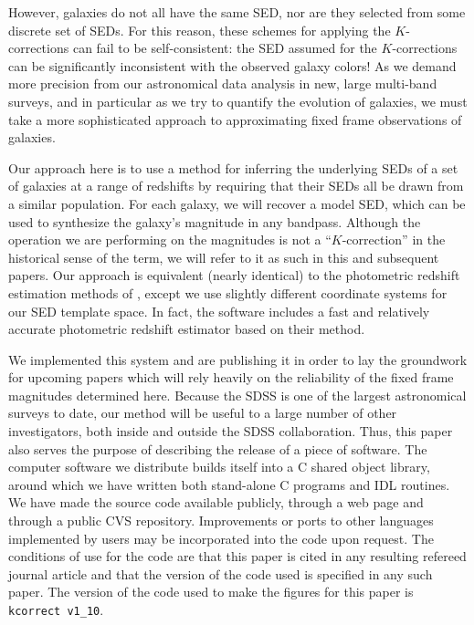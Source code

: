\documentclass[10pt,preprint]{aastex}
\newcommand{\kversion}{{\tt v1\_10}}
\begin{document}
However, galaxies do not all have the same SED, nor are they selected
from some discrete set of SEDs. For this reason, these schemes for
applying the $K$-corrections can fail to be self-consistent: the SED
assumed for the $K$-corrections can be significantly inconsistent with
the observed galaxy colors! As we demand more precision from our
astronomical data analysis in new, large multi-band surveys, and in
particular as we try to quantify the evolution of galaxies, we must
take a more sophisticated approach to approximating fixed frame
observations of galaxies.

Our approach here is to use a method for inferring the underlying SEDs
of a set of galaxies at a range of redshifts by requiring that their
SEDs all be drawn from a similar population. For each galaxy, we will
recover a model SED, which can be used to synthesize the galaxy's
magnitude in any bandpass. Although the operation we are performing on
the magnitudes is not a ``$K$-correction'' in the historical sense of
the term, we will refer to it as such in this and subsequent
papers. Our approach is equivalent (nearly identical) to the
photometric redshift estimation methods of \citet{csabai00a},
except we use slightly different coordinate systems for our SED
template space. In fact, the software includes a fast and relatively
accurate photometric redshift estimator based on their method.

We implemented this system and are publishing it in order to lay the
groundwork for upcoming papers which will rely heavily on the
reliability of the fixed frame magnitudes determined here.  Because
the SDSS is one of the largest astronomical surveys to date, our
method will be useful to a large number of other investigators, both
inside and outside the SDSS collaboration.  Thus, this paper also
serves the purpose of describing the release of a piece of
software. The computer software we distribute builds itself into a C
shared object library, around which we have written both stand-alone C
programs and IDL routines. We have made the source code available
publicly, through a web page and through a public CVS
repository. Improvements or ports to other languages implemented by
users may be incorporated into the code upon request. The conditions
of use for the code are that this paper is cited in any resulting
refereed journal article and that the version of the code used is
specified in any such paper. The version of the code used to make the
figures for this paper is {\tt kcorrect \kversion}.
\end{document}

